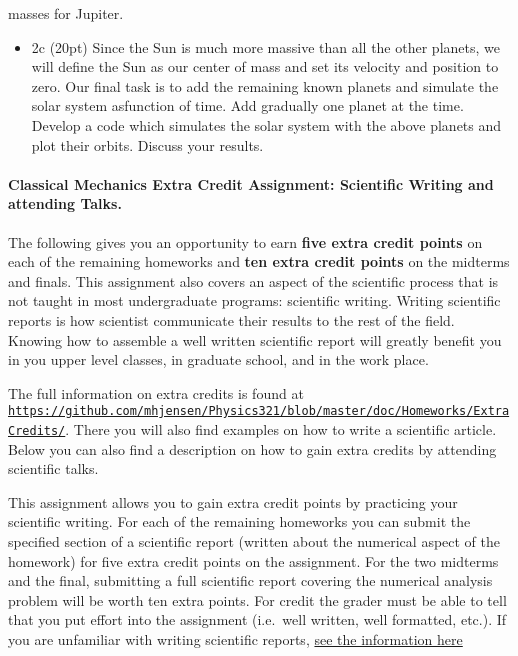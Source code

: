 \documentclass[%
oneside,                 %
final,                   %
10pt]{article}
\begin{document}
\noindent
masses for Jupiter.

\begin{itemize}
\item 2c (20pt) Since the Sun is much more massive than all the other planets, we will define the Sun as our center of mass and set its velocity and position to zero.  Our final task is to add the remaining known planets and simulate the solar system asfunction of time. Add gradually one planet at the time. Develop a code which simulates the solar system with the above planets and plot their orbits. Discuss your results.
\end{itemize}

\noindent
\paragraph{Classical Mechanics Extra Credit Assignment: Scientific Writing and attending Talks.}
The following gives you an opportunity to earn \textbf{five extra credit
points} on each of the remaining homeworks and \textbf{ten extra credit points}
on the midterms and finals.  This assignment also covers an aspect of
the scientific process that is not taught in most undergraduate
programs: scientific writing.  Writing scientific reports is how
scientist communicate their results to the rest of the field.  Knowing
how to assemble a well written scientific report will greatly benefit
you in you upper level classes, in graduate school, and in the work
place.

The full information on extra credits is found at \href{{https://github.com/mhjensen/Physics321/blob/master/doc/Homeworks/ExtraCredits/}}{\nolinkurl{https://github.com/mhjensen/Physics321/blob/master/doc/Homeworks/ExtraCredits/}}. There you will also find examples on how to write a scientific article. 
Below you can also find a description on how to gain extra credits by attending scientific talks.


This assignment allows you to gain extra credit points by practicing
your scientific writing.  For each of the remaining homeworks you can
submit the specified section of a scientific report (written about the
numerical aspect of the homework) for five extra credit points on the
assignment.  For the two midterms and the final, submitting a full
scientific report covering the numerical analysis problem will be
worth ten extra points.  For credit the grader must be able to tell
that you put effort into the assignment (i.e.~well written, well
formatted, etc.).  If you are unfamiliar with writing scientific
reports, \href{{https://github.com/mhjensen/Physics321/blob/master/doc/Homeworks/ExtraCredits/IntroductionScientificWriting.md}}{see the information here}
\end{document}
